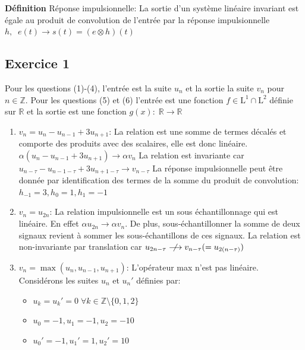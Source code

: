 \documentclass[12pt]{article}
\begin{document}
\textbf{Définition} Réponse impulsionnelle: \newline
La sortie d'un système linéaire invariant est égale au produit de convolution de l'entrée par la réponse impulsionnelle $h, \;\;e(t) \longrightarrow s(t) = (e \otimes h)(t)$


\subsection*{Exercice 1}
Pour les questions (1)-(4), l'entrée est la suite $u_n$ et la sortie la suite $v_n$ pour $n \in \mathbb{Z}$. \newline
Pour les questions (5) et (6) l'entrée est une fonction $f \in \mathrm{L}^1 \cap \mathrm{L}^2$ définie sur $\mathbb{R}$ et la sortie est une fonction $g(x): \; \mathbb{R} \rightarrow \mathbb{R}$
\begin{enumerate}
\item $v_n = u_n - u_{n-1} + 3u_{n+1}$: \newline
La relation est une somme de termes décalés et comporte des produits avec des scalaires, elle est donc linéaire. $\alpha(u_n - u_{n-1} + 3u_{n+1}) \rightarrow \alpha v_n$ \newline
La relation est invariante car $u_{n-\tau} - u_{n-1-\tau} + 3u_{n+1-\tau} \rightarrow v_{n-\tau}$ \newline
La réponse impulsionnelle peut être donnée par identification des termes de la somme du produit de convolution: $h_{-1} = 3, h_0 = 1, h_1 = -1$
\item $v_n = u_{2n}$: \newline
La relation impulsionnelle est un sous échantillonnage qui est linéaire. En effet $\alpha u_{2n} \rightarrow \alpha v_n$. De plus, sous-échantillonner la somme de deux signaux revient à sommer les sous-échantillons de ces signaux.
La relation est non-invariante par translation car $u_{2n-\tau} \centernot\longrightarrow v_{n-\tau} (=u_{2(n-\tau)})$
\item $v_n = \max(u_n, u_{n-1}, u_{n+1})$: \newline
L'opérateur max n'est pas linéaire. Considérons les suites $u_n$ et $u_n'$ définies par: \newline
\begin{itemize}
\item $u_k = u_k' = 0 \;\forall k \in \mathbb{Z} \setminus \{0, 1, 2\}$
\item $u_0 = -1, u_1 = -1, u_2 = -10 $
\item $u_0' = -1, u_1' = 1, u_2' = 10 $

\end{itemize}
\end{enumerate}
\end{document}
